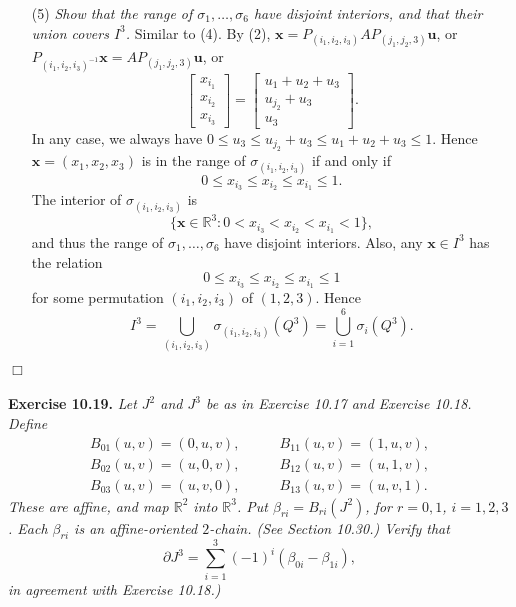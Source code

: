 \documentclass{article}
\begin{document}
\begin{enumerate}
\item[(5)]
  \emph{Show that the range of $\sigma_1, \ldots, \sigma_6$ have disjoint interiors,
  and that their union covers $I^3$.}
  Similar to (4).
  By (2),
  $\mathbf{x} = P_{(i_1,i_2,i_3)} A P_{(j_1,j_2,3)}\mathbf{u}$,
  or
  $P_{(i_1,i_2,i_3)^{-1}} \mathbf{x} = A P_{(j_1,j_2,3)}\mathbf{u}$,
  or
  \[
    \begin{bmatrix}
        x_{i_1} \\
        x_{i_2} \\
        x_{i_3}
    \end{bmatrix}
    =
    \begin{bmatrix}
        u_1+u_2+u_3 \\
        u_{j_2}+u_3 \\
        u_3
    \end{bmatrix}.
  \]
  In any case, we always have
  $0 \leq u_3 \leq u_{j_2}+u_3 \leq u_1+u_2+u_3 \leq 1$.
  Hence
  $\mathbf{x} = (x_1, x_2, x_3)$ is in the range of $\sigma_{(i_1, i_2, i_3)}$
  if and only if
  \[
    0 \leq x_{i_3} \leq x_{i_2} \leq x_{i_1} \leq 1.
  \]
  The interior of $\sigma_{(i_1, i_2, i_3)}$ is
  \[
    \{ \mathbf{x} \in \mathbb{R}^3 : 0 < x_{i_3} < x_{i_2} < x_{i_1} < 1 \},
  \]
  and thus the range of $\sigma_1, \ldots, \sigma_6$ have disjoint interiors.
  Also, any $\mathbf{x} \in I^3$ has the relation
  \[
    0 \leq x_{i_3} \leq x_{i_2} \leq x_{i_1} \leq 1
  \]
  for some permutation $(i_1,i_2,i_3)$ of $(1,2,3)$.
  Hence
  \[
    I^3
    = \bigcup_{(i_1,i_2,i_3)} \sigma_{(i_1,i_2,i_3)}(Q^3)
    = \bigcup_{i=1}^{6} \sigma_{i}(Q^3).
  \]
\end{enumerate}
$\Box$ \\\\






\textbf{Exercise 10.19.}
\emph{Let $J^2$ and $J^3$ be as in Exercise 10.17 and Exercise 10.18.
Define
\begin{align*}
  B_{01}(u,v) = (0,u,v), &\qquad B_{11}(u,v) = (1,u,v), \\
  B_{02}(u,v) = (u,0,v), &\qquad B_{12}(u,v) = (u,1,v), \\
  B_{03}(u,v) = (u,v,0), &\qquad B_{13}(u,v) = (u,v,1).
\end{align*}
These are affine, and map $\mathbb{R}^2$ into $\mathbb{R}^3$.
Put $\beta_{ri} = B_{ri}(J^2)$, for $r=0,1$, $i=1,2,3$.
Each $\beta_{ri}$ is an affine-oriented $2$-chain. (See Section 10.30.)
Verify that
\[
  \partial J^3 = \sum_{i=1}^{3} (-1)^{i} (\beta_{0i}-\beta_{1i}),
\]
in agreement with Exercise 10.18.)} \\
\end{document}
